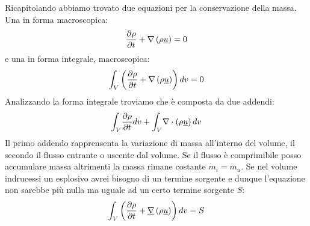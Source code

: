 Ricapitolando abbiamo trovato due equazioni per la conservazione della massa.\\
Una in forma macroscopica:
\[
\frac{\partial\rho }{\partial t}+ \nabla \left( \rho \underline{u}\right) =0
\]
e una in forma integrale, macroscopica:
\[
\displaystyle{\int_{V}^{}}\left( \frac{\partial\rho }{\partial t}+\nabla \left( \rho \underline{u}\right) \right) dv = 0
\]
Analizzando la forma integrale troviamo che è composta da due addendi:
\[
\displaystyle{\int_{V}^{}}\frac{\partial\rho }{\partial t}dv + \displaystyle{\int_{V}^{}}\nabla \cdot \left( \rho \underline{u}\right) dv
\]
Il primo addendo rapprensenta la variazione di massa all'interno del volume, il secondo il flusso entrante o uscente dal volume. Se il flusso è comprimibile posso accumulare massa altrimenti la massa rimane costante $ \dot{m}_i = \dot{m}_u $. Se nel volume indrucessi un esplosivo avrei bisogno di un termine sorgente e dunque l'equazione non sarebbe più nulla ma uguale ad un certo termine sorgente $ S $:
\[
\displaystyle{\int_{V}^{}}\left( \frac{\partial\rho }{\partial t} + \underline{\nabla} \left( \rho \underline{u}\right) \right) dv = S
\]



